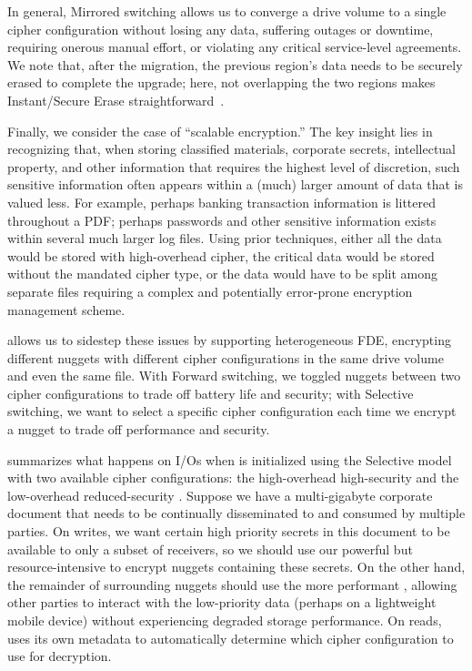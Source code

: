 In general, Mirrored switching allows us to converge a drive volume to a single
cipher configuration without losing any data, suffering outages or downtime,
requiring onerous manual effort, or violating any critical service-level
agreements. We note that, after the migration, the previous region's data needs
to be securely erased to complete the upgrade; here, not overlapping the two
regions makes Instant/Secure Erase straightforward~\cite{ISE1,ISE2}.



 Finally, we consider the case of ``scalable
encryption.'' The key insight lies in recognizing that, when storing classified
materials, corporate secrets, intellectual property, and other information that
requires the highest level of discretion, such sensitive information often
appears within a (much) larger amount of data that is valued less. For example,
perhaps banking transaction information is littered throughout a PDF; perhaps
passwords and other sensitive information exists within several much larger log
files. Using prior techniques, either all the data would be stored with
high-overhead cipher, the critical data would be stored without the mandated
cipher type, or the data would have to be split among separate files requiring a
complex and potentially error-prone encryption management scheme.

\sys allows us to sidestep these issues by supporting heterogeneous FDE, \ie
encrypting different nuggets with different cipher configurations in the same
drive volume and even the same file. With Forward switching, we toggled nuggets
between two cipher configurations to trade off battery life and security; with
Selective switching, we want to select a specific cipher configuration each time
we encrypt a nugget to trade off performance and security.

 summarizes what happens on I/Os when \sys is initialized
using the Selective model with two available cipher configurations: the
high-overhead high-security \cone and the low-overhead reduced-security \ctwo.
Suppose we have a multi-gigabyte corporate document that needs to be continually
disseminated to and consumed by multiple parties. On writes, we want certain
high priority secrets in this document to be available to only a subset of
receivers, so we should use our powerful but resource-intensive \cone to encrypt
nuggets containing these secrets. On the other hand, the remainder of
surrounding nuggets should use the more performant \ctwo, allowing other parties
to interact with the low-priority data (perhaps on a lightweight mobile device)
without experiencing degraded storage performance. On reads, \sys uses its own
metadata to automatically determine which cipher configuration to use for
decryption.
